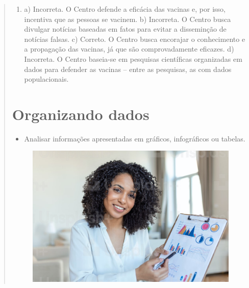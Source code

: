 \begin{quote}
\begin{enumerate}
\item
a) Incorreta. O Centro defende a eficácia das vacinas e, por isso, incentiva
que as pessoas se vacinem.
b) Incorreta. O Centro busca divulgar notícias baseadas em fatos para
evitar a disseminção de notícias falsas.
c) Correto. O Centro busca encorajar o conhecimento e a propagação das
vacinas, já que são comprovadamente eficazes.
d) Incorreta. O Centro baseia-se em pesquisas científicas organizadas em
dados para defender as vacinas -- entre as pesquisas, as com dados populacionais.

\end{enumerate}

\chapter{Organizando dados}



\begin{itemize}
\item Analisar informações apresentadas em gráficos, infográficos ou tabelas.
\end{itemize}

\begin{figure}[htpb!]
\includegraphics[width=.5\textwidth]{./imgs/img22.jpg}
\end{figure}

\end{quote}
